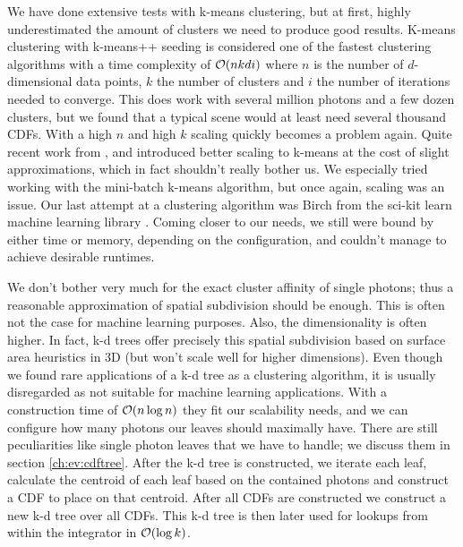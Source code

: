 We have done extensive tests with k-means clustering, but at first, highly underestimated the amount of clusters we need to produce good results. K-means clustering with k-means++ seeding \parencite{DBLP:conf/soda/ArthurV07} is considered one of the fastest clustering algorithms with a time complexity of $\mathcal{O}(nkdi)$ where $n$ is the number of $d$-dimensional data points, $k$ the number of clusters and $i$ the number of iterations needed to converge. This does work with several million photons and a few dozen clusters, but we found that a typical scene would at least need several thousand CDFs. With a high $n$ and high $k$ scaling quickly becomes a problem again. Quite recent work from \textcite{DBLP:conf/kse/HieuM14}, \textcite{DBLP:journals/tpds/XuQLMLL14} and \textcite{DBLP:conf/www/Sculley10} introduced better scaling to k-means at the cost of slight approximations, which in fact shouldn't really bother us. We especially tried working with the mini-batch k-means algorithm, but once again, scaling was an issue. Our last attempt at a clustering algorithm was Birch \parencite{DBLP:conf/sigmod/ZhangRL96} from the sci-kit learn machine learning library \parencite{scikit-learn}. Coming closer to our needs, we still were bound by either time or memory, depending on the configuration, and couldn't manage to achieve desirable runtimes.

We don't bother very much for the exact cluster affinity of single photons; thus a reasonable approximation of spatial subdivision should be enough. This is often not the case for machine learning purposes. Also, the dimensionality is often higher. In fact, k-d trees offer precisely this spatial subdivision based on surface area heuristics in 3D (but won't scale well for higher dimensions). Even though we found rare applications of a k-d tree as a clustering algorithm, it is usually disregarded as not suitable for machine learning applications. With a construction time of $\mathcal{O}(n \log n)$ they fit our scalability needs, and we can configure how many photons our leaves should maximally have. There are still peculiarities like single photon leaves that we have to handle; we discuss them in section \ref{ch:ev:cdftree}. After the k-d tree is constructed, we iterate each leaf, calculate the centroid of each leaf based on the contained photons and construct a CDF to place on that centroid. After all CDFs are constructed we construct a new k-d tree over all CDFs. This k-d tree is then later used for lookups from within the integrator in $\mathcal{O}(\log k)$.

